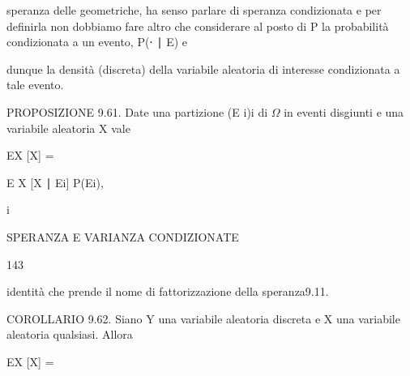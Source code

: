 \documentclass[a4paper,portrait,12pt]{article}
\begin{document}
\begin{flushleft}
speranza delle geometriche, ha senso parlare di speranza condizionata e per definirla non dobbiamo fare altro che considerare al posto di P la probabilit\`{a} condizionata a un evento, P(⋅ ∣ E) e
\end{flushleft}


\begin{flushleft}
dunque la densit\`{a} (discreta) della variabile aleatoria di interesse condizionata a tale evento.
\end{flushleft}


\begin{flushleft}
PROPOSIZIONE 9.61. Date una partizione (E i)i di $\Omega$ in eventi disgiunti e una variabile aleatoria X vale
\end{flushleft}


\begin{flushleft}
EX [X] =
\end{flushleft}





\begin{flushleft}
E X [X ∣ Ei] P(Ei),
\end{flushleft}


\begin{flushleft}
i
\end{flushleft}





\begin{flushleft}
 SPERANZA E VARIANZA CONDIZIONATE
\end{flushleft}





143





\begin{flushleft}
identit\`{a} che prende il nome di fattorizzazione della speranza9.11.
\end{flushleft}


\begin{flushleft}
COROLLARIO 9.62. Siano Y una variabile aleatoria discreta e X una variabile aleatoria qualsiasi. Allora
\end{flushleft}


\begin{flushleft}
EX [X] =
\end{flushleft}
\end{document}
